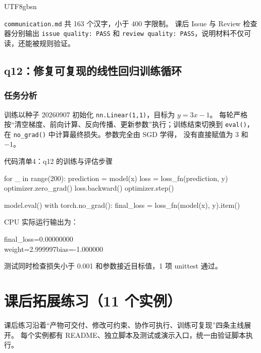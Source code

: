 \documentclass[11pt]{article}
\begin{document}
\begin{CJK*}{UTF8}{gbsn}
\begin{resultbox}
\texttt{communication.md} 共 163 个汉字，小于 400 字限制。
课后 Issue 与 Review 检查器分别输出 \texttt{issue quality: PASS} 和
\texttt{review quality: PASS}，说明材料不仅可读，还能被规则验证。
\end{resultbox}

\subsection{q12：修复可复现的线性回归训练循环}
\subsubsection{任务分析}
训练以种子 20260907 初始化 \texttt{nn.Linear(1,1)}，目标为 $y=3x-1$。
每轮严格按“清空梯度、前向计算、反向传播、更新参数”执行；训练结束切换到
\texttt{eval()}，在 \texttt{no\_grad()} 中计算最终损失。参数完全由 SGD 学得，
没有直接赋值为 3 和 $-1$。

\begin{center}\color{SlateGray}代码清单4：q12 的训练与评估步骤\end{center}
\begin{CodeBlock}
for _ in range(200):
    prediction = model(x)
    loss = loss_fn(prediction, y)
    optimizer.zero_grad()
    loss.backward()
    optimizer.step()

model.eval()
with torch.no_grad():
    final_loss = loss_fn(model(x), y).item()
\end{CodeBlock}

\begin{resultbox}
CPU 实际运行输出为：
\begin{center}\ttfamily
final\_loss=0.00000000\\
weight=2.999997\qquad bias=-1.000000
\end{center}
测试同时检查损失小于 0.001 和参数接近目标值，1 项 unittest 通过。
\end{resultbox}

\section{课后拓展练习（11 个实例）}

课后练习沿着“产物可交付、修改可约束、协作可执行、训练可复现”四条主线展开。
每个实例都有 README、独立脚本及测试或演示入口，统一由验证脚本执行。


\end{CJK*}
\end{document}
